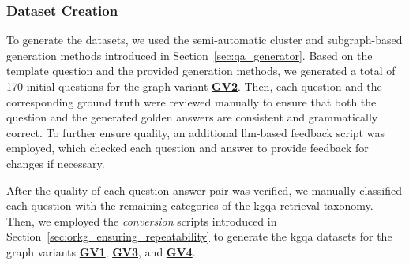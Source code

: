 \subsubsection{Dataset Creation} 
To generate the datasets, we used the semi-automatic cluster and subgraph-based generation methods introduced in Section~\ref{sec:qa_generator}. Based on the template question and the provided generation methods, we generated a total of 170 initial questions for the graph variant \hyperref[enum:gv2]{\textbf{GV2}}. Then, each question and the corresponding ground truth were reviewed manually to ensure that both the question and the generated golden answers are consistent and grammatically correct. To further ensure quality, an additional \gls{llm}-based feedback script was employed, which checked each question and answer to provide feedback for changes if necessary.

After the quality of each question-answer pair was verified, we manually classified each question with the remaining categories of the \gls{kgqa} retrieval taxonomy. Then, we employed the \emph{conversion} scripts introduced in Section~\ref{sec:orkg_ensuring_repeatability} to generate the \gls{kgqa} datasets for the graph variants \hyperref[enum:gv1]{\textbf{GV1}}, \hyperref[enum:gv3]{\textbf{GV3}}, and \hyperref[enum:gv4]{\textbf{GV4}}.


